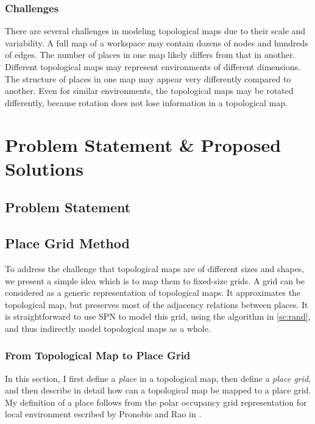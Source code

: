 \documentclass[10pt, titlepage]{article}
\theoremstyle{definition}
\begin{document}
\subsubsection{Challenges}
There are several challenges in modeling topological maps due to their scale and variability. A full map of a workspace may contain dozens of nodes and hundreds of edges. The number of places in one map likely differs from that in another. Different topological maps may represent environments of different dimensions. The structure of places in one map may appear very differently compared to another. Even for similar environments, the topological maps may be rotated differently, because rotation does not lose information in a topological map. 


\section{Problem Statement \& Proposed Solutions}\label{section:sol}
\subsection{Problem Statement}\label{section:problem}
\subsection{Place Grid Method}\label{section:grid}
To address the challenge that topological maps are of different sizes and shapes, we present a simple idea which is to map them to fixed-size grids. A grid can be considered as a generic representation of topological maps. It approximates the topological map, but preserves most of the adjacency relations between places. It is straightforward to use SPN to model this grid, using the algorithm in \ref{sc:rand}, and thus indirectly model topological maps as a whole. 

\subsubsection{From Topological Map to Place Grid}

In this section, I first define a \textit{place} in a topological map, then define a \textit{place grid}, and then describe in detail how can a topological map be mapped to a place grid. My definition of a place follows from the polar occupancy grid representation for local environment escribed by Pronobis and Rao in \cite{pronobis2016learning}.
\end{document}
